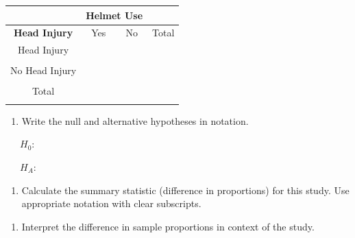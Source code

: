 \documentclass[
]{report}
\providecommand{\tightlist}{%
  \setlength{\itemsep}{0pt}\setlength{\parskip}{0pt}}
\begin{document}
\begin{center}
\begin{tabular}{|c|c|c|c|}\hline
& \multicolumn{2}{|c|}{\textbf{Helmet Use}} & \\ \hline
\textbf{Head Injury} & \hspace{0.35in} Yes \hspace{0.35in} & \hspace{0.35in} No \hspace{0.35in} & \hspace{0.35in} Total \hspace{0.35in} \\ \hline
Head Injury & & & \\ 
 & & & \\ \hline
No Head Injury & & & \\ 
 & & & \\ \hline
 Total & & & \\ 
 & & & \\ \hline
\end{tabular}
\end{center}

\begin{enumerate}
\def\labelenumi{\arabic{enumi}.}
\setcounter{enumi}{1}
\tightlist
\item
  Write the null and alternative hypotheses in notation.
\end{enumerate}

~~~\(H_0\):

\vspace{0.2in}

~~~\(H_A\):

\vspace{0.2in}

\begin{enumerate}
\def\labelenumi{\arabic{enumi}.}
\setcounter{enumi}{2}
\tightlist
\item
  Calculate the summary statistic (difference in proportions) for this study. Use appropriate notation with clear subscripts.
\end{enumerate}

\vspace{0.8in}

\begin{enumerate}
\def\labelenumi{\arabic{enumi}.}
\setcounter{enumi}{3}
\tightlist
\item
  Interpret the difference in sample proportions in context of the study.
  \vspace{1in}
\end{enumerate}
\end{document}
